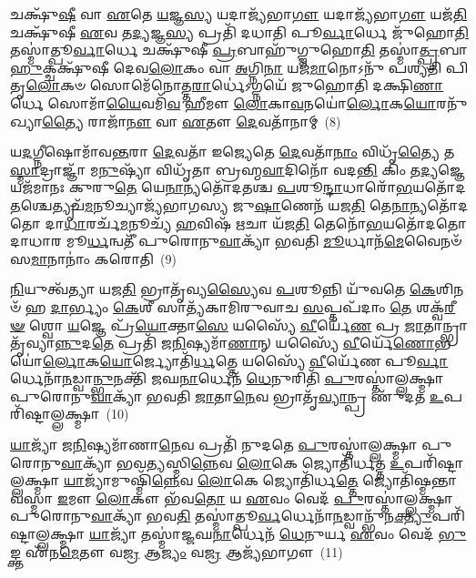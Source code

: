 𑌚𑌕𑍍𑌷𑍁᳴\-\ul{𑌷𑍀} 𑌵𑌾 \ul{𑌏}\-𑌤𑍇 \ul{𑌯}\-𑌜𑍍𑌞\-\ul{𑌸𑍍𑌯} 𑌯𑌦𑌾𑌜𑍍𑌯᳴𑌭𑌾\-\ul{𑌗𑍗} 𑌯𑌦𑌾𑌜𑍍𑌯᳴𑌭𑌾\-\ul{𑌗𑍗} 𑌯𑌜᳴\-\ul{𑌤𑌿} 𑌚𑌕𑍍𑌷𑍁᳴𑌷𑍀 \ul{𑌏}\-𑌵 𑌤\-\ul{𑌦𑍍𑌯}\-𑌜𑍍𑌞\-\ul{𑌸𑍍𑌯} 𑌪𑍍𑌰𑌤𑌿᳴ 𑌦𑌧𑌾𑌤𑌿 𑌪𑍂\-\ul{𑌰𑍍𑌵𑌾}\-𑌰𑍍𑌧𑍇 𑌜𑍁᳴𑌹𑍋\-\ul{𑌤𑌿} 𑌤𑌸𑍍𑌮𑌾॑𑌤𑍍𑌪𑍂\-\ul{𑌰𑍍𑌵𑌾}\-𑌰𑍍𑌧𑍇 𑌚𑌕𑍍𑌷𑍁᳴𑌷𑍀 \ul{𑌪𑍍𑌰}\-𑌬𑌾𑌹𑍁᳴𑌗𑍍𑌜𑍁𑌹𑍋\-\ul{𑌤𑌿} 𑌤𑌸𑍍𑌮𑌾॑\-\ul{𑌤𑍍𑌪𑍍𑌰}\-𑌬𑌾\-\ul{𑌹𑍁}\-𑌕𑍍𑌚𑌕𑍍𑌷𑍁᳴𑌷𑍀 𑌦𑍇𑌵\-\ul{𑌲𑍋}\-𑌕𑌂 𑌵𑌾 \ul{𑌅}\-𑌗𑍍𑌨𑌿\-\ul{𑌨𑌾} 𑌯𑌜᳴\-\ul{𑌮𑌾}\-𑌨𑍋\-𑌽𑌨𑍁᳴ 𑌪𑌶𑍍𑌯𑌤𑌿 𑌪𑌿𑌤𑍃\-\ul{𑌲𑍋}\-𑌕𑍞 𑌸𑍋𑌮𑍇᳴𑌨𑍋𑌤𑍍𑌤\-\ul{𑌰𑌾}\-𑌰𑍍𑌧𑍇॑\-𑌽𑌗𑍍𑌨𑌯𑍇᳴ 𑌜𑍁𑌹𑍋𑌤𑌿 𑌦𑌕𑍍𑌷𑌿\-\ul{𑌣𑌾}\-𑌰𑍍𑌧𑍇 𑌸𑍋𑌮𑌾᳴\-\ul{𑌯𑍈}\-𑌵𑌮𑌿᳴\-\ul{𑌵} 𑌹𑍀𑌮𑍗 \ul{𑌲𑍋}\-𑌕𑌾\-\ul{𑌵}\-𑌨𑌯𑍋॑\-\ul{𑌰𑍍𑌲𑍋}\-𑌕\-\ul{𑌯𑍋}\-𑌰𑌨𑍁᳴𑌖𑍍𑌯𑌾\-\ul{𑌤𑍍𑌯𑍈} 𑌰𑌾𑌜𑌾᳴\-\ul{𑌨𑍗} 𑌵𑌾 \ul{𑌏}\-𑌤𑍗 \ul{𑌦𑍇}\-𑌵𑌤𑌾᳴𑌨𑌾𑌮𑍍~(8)

𑌯\-\ul{𑌦}\-𑌗𑍍𑌨𑍀𑌷𑍋𑌮𑌾᳴𑌵\-\ul{𑌨𑍍𑌤}\-𑌰𑌾 \ul{𑌦𑍇}\-𑌵𑌤𑌾᳴ 𑌇𑌜𑍍𑌯𑍇𑌤𑍇 \ul{𑌦𑍇}\-𑌵𑌤𑌾᳴\-\ul{𑌨𑌾𑌂} 𑌵𑌿𑌧𑍃᳴\-\ul{𑌤𑍍𑌯𑍈} 𑌤\-\ul{𑌸𑍍𑌮𑌾}\-𑌦𑍍𑌰𑌾𑌜𑍍𑌞𑌾᳴ 𑌮\-\ul{𑌨𑍁}\-𑌷𑍍𑌯𑌾᳴ 𑌵𑌿𑌧𑍃᳴𑌤𑌾 𑌬𑍍𑌰𑌹𑍍𑌮\-\ul{𑌵𑌾}\-𑌦𑌿𑌨𑍋᳴ 𑌵𑌦\-\ul{𑌨𑍍𑌤𑌿} 𑌕𑌿𑌂 𑌤\-\ul{𑌦𑍍𑌯}\-𑌜𑍍𑌞𑍇 𑌯𑌜᳴𑌮𑌾𑌨𑌃 𑌕𑍁𑌰𑍁\-\ul{𑌤𑍇} 𑌯𑍇\-\ul{𑌨𑌾}\-𑌨𑍍𑌯𑌤𑍋᳴𑌦𑌤𑌶𑍍𑌚 \ul{𑌪}\-𑌶𑍂\-\ul{𑌨𑍍𑌦𑌾}\-𑌧𑌾𑌰𑍋᳴\-\ul{𑌭}\-𑌯𑌤𑍋᳴𑌦\-\ul{𑌤}\-𑌶𑍍𑌚𑍇𑌤𑍍𑌯𑍃𑌚᳴\-\ul{𑌮}\-𑌨𑍂𑌚𑍍𑌯𑌾𑌜𑍍𑌯᳴𑌭𑌾𑌗𑌸𑍍𑌯 𑌜𑍁\-\ul{𑌷𑌾}\-𑌣𑍇𑌨᳴ 𑌯𑌜\-\ul{𑌤𑌿} 𑌤𑍇\-\ul{𑌨𑌾}\-𑌨𑍍𑌯𑌤𑍋᳴𑌦𑌤𑍋 𑌦𑌾\-\ul{𑌧𑌾}\-𑌰𑌰𑍍𑌚᳴\-\ul{𑌮}\-𑌨𑍂𑌚𑍍𑌯᳴ \ul{𑌹}\-𑌵𑌿𑌷᳴ \ul{𑌋}\-𑌚𑌾 𑌯᳴𑌜\-\ul{𑌤𑌿} 𑌤𑍇𑌨𑍋᳴\-\ul{𑌭}\-𑌯𑌤𑍋᳴𑌦𑌤𑍋 𑌦𑌾𑌧𑌾𑌰 𑌮𑍂\-\ul{𑌰𑍍𑌧}\-𑌨𑍍𑌵𑌤𑍀᳴ 𑌪𑍁𑌰𑍋𑌨𑍁\-\ul{𑌵𑌾}\-𑌕𑍍𑌯𑌾᳴ 𑌭𑌵𑌤𑌿 \ul{𑌮𑍂}\-𑌰𑍍𑌧𑌾𑌨᳴\-\ul{𑌮𑍇}\-𑌵𑍈𑌨𑍞᳴ 𑌸\-\ul{𑌮𑌾}\-𑌨𑌾𑌨𑌾𑌂॑ 𑌕𑌰𑍋𑌤𑌿~(9)

\-\ul{𑌨𑌿}\-𑌯𑍁𑌤𑍍𑌵᳴𑌤𑍍𑌯𑌾 𑌯𑌜\-\ul{𑌤𑌿} 𑌭𑍍𑌰𑌾𑌤𑍃᳴𑌵𑍍𑌯\-\ul{𑌸𑍍𑌯𑍈}\-𑌵 \ul{𑌪}\-𑌶𑍂𑌨𑍍𑌨𑌿 𑌯𑍁᳴𑌵𑌤𑍇 \ul{𑌕𑍇}\-𑌶𑌿𑌨𑍞᳴ 𑌹 \ul{𑌦𑌾}\-𑌰𑍍𑌭𑍍𑌯𑌂 \ul{𑌕𑍇}\-𑌶𑍀 𑌸𑌾𑌤𑍍𑌯᳴𑌕𑌾𑌮𑌿𑌰𑍁𑌵𑌾𑌚 \ul{𑌸}\-𑌪𑍍𑌤𑌪᳴𑌦𑌾𑌂 \ul{𑌤𑍇} 𑌶𑌕𑍍𑌵᳴\-\ul{𑌰𑍀}\-\-\ul{𑍟} 𑌶𑍍𑌵𑍋 \ul{𑌯}\-𑌜𑍍𑌞𑍇 𑌪𑍍𑌰᳴\-\ul{𑌯𑍋}\-𑌕𑍍𑌤𑌾\-\ul{𑌸𑍇} 𑌯𑌸𑍍𑌯𑍈᳴ \ul{𑌵𑍀}\-𑌰𑍍𑌯𑍇᳴\-\ul{𑌣} 𑌪𑍍𑌰 \ul{𑌜𑌾}\-𑌤𑌾𑌨𑍍𑌭𑍍𑌰𑌾𑌤𑍃᳴𑌵𑍍𑌯𑌾\-\ul{𑌨𑍍𑌨𑍁}\-𑌦\-\ul{𑌤𑍇} 𑌪𑍍𑌰𑌤𑌿᳴ 𑌜\-\ul{𑌨𑌿}\-𑌷𑍍𑌯𑌮𑌾᳴\-\ul{𑌣𑌾}\-𑌨𑍍 𑌯𑌸𑍍𑌯𑍈᳴ \ul{𑌵𑍀}\-𑌰𑍍𑌯𑍇᳴\-\ul{𑌣𑍋}\-𑌭𑌯𑍋॑\-\ul{𑌰𑍍𑌲𑍋}\-𑌕\-\ul{𑌯𑍋}\-𑌰𑍍𑌜𑍍𑌯𑍋𑌤𑌿᳴\-\ul{𑌰𑍍𑌧}\-𑌤𑍍𑌤𑍇 𑌯𑌸𑍍𑌯𑍈᳴ \ul{𑌵𑍀}\-𑌰𑍍𑌯𑍇᳴𑌣 𑌪𑍂\-\ul{𑌰𑍍𑌵𑌾}\-𑌰𑍍𑌧𑍇𑌨𑌾᳴\-\ul{𑌨}\-𑌡𑍍𑌵𑌾\-\ul{𑌨𑍍𑌭𑍁}\-𑌨𑌕𑍍𑌤𑌿᳴ 𑌜𑌘\-\ul{𑌨𑌾}\-𑌰𑍍𑌧𑍇𑌨᳴ \ul{𑌧𑍇}\-𑌨𑍁𑌰𑌿𑌤𑌿᳴ \ul{𑌪𑍁}\-𑌰𑌸𑍍𑌤𑌾॑𑌲𑍍𑌲𑌕𑍍𑌷𑍍𑌮𑌾 𑌪𑍁𑌰𑍋𑌨𑍁\-\ul{𑌵𑌾}\-𑌕𑍍𑌯𑌾᳴ 𑌭𑌵𑌤𑌿 \ul{𑌜𑌾}\-𑌤𑌾\-\ul{𑌨𑍇}\-𑌵 𑌭𑍍𑌰𑌾𑌤𑍃᳴\-\ul{𑌵𑍍𑌯𑌾}\-𑌨𑍍𑌪𑍍𑌰 𑌣𑍁᳴𑌦𑌤 \ul{𑌉}\-𑌪𑌰𑌿᳴𑌷𑍍𑌟𑌾𑌲𑍍𑌲𑌕𑍍𑌷𑍍𑌮𑌾~(10)

\-\ul{𑌯𑌾}\-𑌜𑍍𑌯𑌾᳴ 𑌜\-\ul{𑌨𑌿}\-𑌷𑍍𑌯𑌮𑌾᳴𑌣𑌾\-\ul{𑌨𑍇}\-𑌵 𑌪𑍍𑌰𑌤𑌿᳴ 𑌨𑍁𑌦𑌤𑍇 \ul{𑌪𑍁}\-𑌰𑌸𑍍𑌤𑌾॑𑌲𑍍𑌲𑌕𑍍𑌷𑍍𑌮𑌾 𑌪𑍁𑌰𑍋𑌨𑍁\-\ul{𑌵𑌾}\-𑌕𑍍𑌯𑌾᳴ 𑌭𑌵\-\ul{𑌤𑍍𑌯}\-𑌸𑍍𑌮𑌿\-\ul{𑌨𑍍𑌨𑍇}\-𑌵 \ul{𑌲𑍋}\-𑌕𑍇 𑌜𑍍𑌯𑍋𑌤𑌿᳴𑌰𑍍𑌧𑌤𑍍𑌤 \ul{𑌉}\-𑌪𑌰𑌿᳴𑌷𑍍𑌟𑌾𑌲𑍍𑌲𑌕𑍍𑌷𑍍𑌮𑌾 \ul{𑌯𑌾}\-𑌜𑍍𑌯𑌾᳴𑌮𑍁𑌷𑍍𑌮𑌿᳴\-\ul{𑌨𑍍𑌨𑍇}\-𑌵 \ul{𑌲𑍋}\-𑌕𑍇 𑌜𑍍𑌯𑍋𑌤𑌿᳴𑌰𑍍𑌧\-\ul{𑌤𑍍𑌤𑍇} 𑌜𑍍𑌯𑍋𑌤𑌿᳴𑌷𑍍𑌮𑌨𑍍𑌤𑌾𑌵𑌸𑍍𑌮𑌾 \ul{𑌇}\-𑌮𑍗 \ul{𑌲𑍋}\-𑌕𑍗 𑌭᳴𑌵\-\ul{𑌤𑍋} 𑌯 \ul{𑌏}\-𑌵𑌂 𑌵𑍇𑌦᳴ \ul{𑌪𑍁}\-𑌰𑌸𑍍𑌤𑌾॑𑌲𑍍𑌲𑌕𑍍𑌷𑍍𑌮𑌾 𑌪𑍁𑌰𑍋𑌨𑍁\-\ul{𑌵𑌾}\-𑌕𑍍𑌯𑌾᳴ 𑌭𑌵\-\ul{𑌤𑌿} 𑌤𑌸𑍍𑌮𑌾॑𑌤𑍍𑌪𑍂\-\ul{𑌰𑍍𑌵}\-𑌰𑍍𑌧𑍇𑌨𑌾᳴\-\ul{𑌨}\-𑌡𑍍𑌵𑌾𑌨𑍍𑌭𑍁᳴𑌨\-\ul{𑌕𑍍𑌤𑍍𑌯𑍁}\-𑌪𑌰𑌿᳴𑌷𑍍𑌟𑌾𑌲𑍍𑌲𑌕𑍍𑌷𑍍𑌮𑌾 \ul{𑌯𑌾}\-𑌜𑍍𑌯𑌾᳴ 𑌤𑌸𑍍𑌮𑌾॑𑌜𑍍𑌜𑌘\-\ul{𑌨𑌾}\-𑌰𑍍𑌧𑍇𑌨᳴ \ul{𑌧𑍇}\-𑌨𑍁𑌰𑍍𑌯 \ul{𑌏}\-𑌵𑌂 𑌵𑍇𑌦᳴ \ul{𑌭𑍁}\-𑌙𑍍𑌕𑍍𑌤 𑌏᳴𑌨\-\ul{𑌮𑍇}\-𑌤𑍗 𑌵\-\ul{𑌜𑍍𑌰} 𑌆\-\ul{𑌜𑍍𑌯𑌂} 𑌵\-\ul{𑌜𑍍𑌰} 𑌆𑌜𑍍𑌯᳴𑌭𑌾𑌗𑍗~(11)

